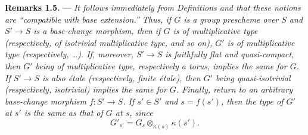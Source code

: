 \medskip
\noindent{}\textbf{Remarks 1.5.} ---
\textit{It follows immediately from Definitions
 and
 that these notions are
``compatible with base extension.'' Thus, if \(G\) is a group prescheme
over \(S\) and \(S'\to S\) is a base-change morphism, then if \(G\)
is of multiplicative type (respectively, of isotrivial multiplicative
type, and so on), \(G'\) is of multiplicative type (respectively,
\ldots). If, moreover, \(S'\to S\) is faithfully flat and
quasi-compact, then \(G'\) being of multiplicative type, respectively a
torus, implies the same for \(G\). If \(S'\to S\) is also étale
(respectively, finite étale), then \(G'\) being quasi-isotrivial
(respectively, isotrivial) implies the same for \(G\). Finally, return to an arbitrary base-change morphism
\(f:S'\to S\). If \(s'\in S'\) and \(s=f(s')\), then the type of \(G'\)
at \(s'\) is the same as that of \(G\) at \(s\), since
\[
  G'_{s'}=G_s\otimes_{\kappa(s)}\kappa(s').
\]}
